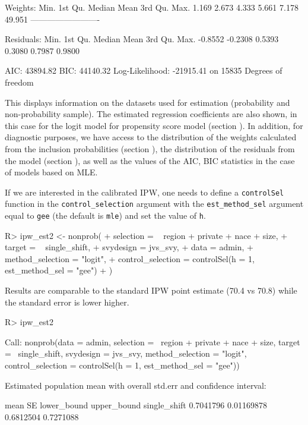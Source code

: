 \documentclass[
]{jss}
\begin{document}
\begin{CodeChunk}
\begin{CodeOutput}
Weights:
   Min. 1st Qu.  Median    Mean 3rd Qu.    Max. 
  1.169   2.673   4.333   5.661   7.178  49.951 
-------------------------

Residuals:
   Min. 1st Qu.  Median    Mean 3rd Qu.    Max. 
-0.8552 -0.2308  0.5393  0.3080  0.7987  0.9800 

AIC: 43894.82
BIC: 44140.32
Log-Likelihood: -21915.41 on 15835 Degrees of freedom
\end{CodeOutput}
\end{CodeChunk}

This displays information on the datasets used for estimation
(probability and non-probability sample). The estimated regression
coefficients are also shown, in this case for the logit model for
propensity score model (section ). In
addition, for diagnostic purposes, we have access to the distribution of
the weights calculated from the inclusion probabilities (section
), the distribution of the residuals from the model
(section ), as well as the values of the AIC, BIC
statistics in the case of models based on MLE.

If we are interested in the calibrated IPW, one needs to define a
\texttt{controlSel} function in the \texttt{control\_selection} argument
with the \texttt{est\_method\_sel} argument equal to \texttt{gee} (the
default is \texttt{mle}) and set the value of \texttt{h}.

\begin{CodeChunk}
\begin{CodeInput}
R> ipw_est2 <- nonprob(
+   selection = ~ region + private + nace + size,
+   target = ~ single_shift,
+   svydesign = jvs_svy,
+   data = admin,
+   method_selection = "logit",
+   control_selection = controlSel(h = 1, est_method_sel = "gee")
+ )
\end{CodeInput}
\end{CodeChunk}

Results are comparable to the standard IPW point estimate (70.4 vs 70.8)
while the standard error is lower higher.

\begin{CodeChunk}
\begin{CodeInput}
R> ipw_est2
\end{CodeInput}
\begin{CodeOutput}

Call:
nonprob(data = admin, selection = ~region + private + nace + 
    size, target = ~single_shift, svydesign = jvs_svy, method_selection = "logit", 
    control_selection = controlSel(h = 1, est_method_sel = "gee"))

Estimated population mean with overall std.err and confidence interval:

                  mean         SE lower_bound upper_bound
single_shift 0.7041796 0.01169878   0.6812504   0.7271088
\end{CodeOutput}
\end{CodeChunk}
\end{document}
